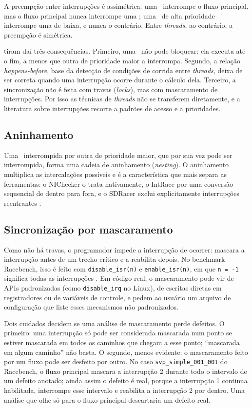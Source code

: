 A preempção entre interrupções é assimétrica: uma \isr\ interrompe o
fluxo principal, mas o fluxo principal nunca interrompe uma \isr; uma \isr\ de
alta prioridade interrompe uma de baixa, e nunca o contrário. Entre
\textit{threads}, ao contrário, a preempção é simétrica.

 tiram daí três consequências. Primeiro, uma \isr\ não pode
bloquear: ela executa até o fim, a menos que outra de prioridade maior a
interrompa. Segundo, a relação \textit{happens-before}, base da detecção de
condições de corrida entre \textit{threads}, deixa de ser correta quando uma
interrupção ocorre durante o cálculo dela. Terceiro, a sincronização não é
feita com travas (\textit{locks}), mas com mascaramento de interrupções. Por
isso as técnicas de \textit{threads} não se transferem diretamente, e a
literatura sobre interrupções recorre a padrões de acesso e a prioridades.

\subsection{Aninhamento}

Uma \isr\ interrompida por outra de prioridade maior, que por sua vez pode ser
interrompida, forma uma cadeia de aninhamento
(\textit{nesting}). O aninhamento multiplica as intercalações possíveis e é a
característica que mais separa as ferramentas: o NIChecker o trata
nativamente, o IntRace por uma conversão sequencial de dentro para fora, e o
SDRacer exclui explicitamente interrupções reentrantes
\cite{nichecker,intrace,sdracer}.

\subsection{Sincronização por mascaramento}

Como não há travas, o programador impede a interrupção de ocorrer:
mascara a interrupção antes de um trecho crítico e a reabilita depois.
No benchmark Racebench, isso é feito com \texttt{disable\_isr(n)} e
\texttt{enable\_isr(n)}, em que \texttt{n = -1} significa todas as
interrupções \cite{racebench}. Em código real, o mascaramento pode vir de APIs
padronizadas (como \texttt{disable\_irq} no Linux), de escritas diretas em
registradores ou de variáveis de controle, e  pedem ao
usuário um arquivo de configuração que liste esses mecanismos não padronizados.

Dois cuidados decidem se uma análise de mascaramento perde defeitos. O
primeiro: uma interrupção só pode ser considerada mascarada num ponto se
estiver mascarada em todos os caminhos que chegam a esse ponto;
``mascarada em algum caminho'' não basta. O segundo, menos evidente: o
mascaramento feito por um fluxo pode ser desfeito por outro. No caso
\texttt{svp\_simple\_001\_001} do Racebench, o fluxo principal mascara a
interrupção 2 durante todo o intervalo de um defeito anotado; ainda assim o
defeito é real, porque a interrupção 1 continua habilitada, interrompe esse
intervalo e reabilita a interrupção 2 por dentro. Uma análise que olhe só para
o fluxo principal descartaria um defeito real.

